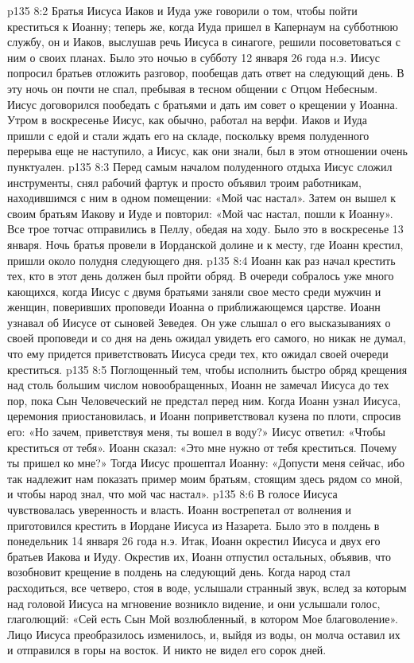 \vs p135 8:2 Братья Иисуса Иаков и Иуда уже говорили о том, чтобы пойти креститься к Иоанну; теперь же, когда Иуда пришел в Капернаум на субботнюю службу, он и Иаков, выслушав речь Иисуса в синагоге, решили посоветоваться с ним о своих планах. Было это ночью в субботу 12 января 26 года н.э. Иисус попросил братьев отложить разговор, пообещав дать ответ на следующий день. В эту ночь он почти не спал, пребывая в тесном общении с Отцом Небесным. Иисус договорился пообедать с братьями и дать им совет о крещении у Иоанна. Утром в воскресенье Иисус, как обычно, работал на верфи. Иаков и Иуда пришли с едой и стали ждать его на складе, поскольку время полуденного перерыва еще не наступило, а Иисус, как они знали, был в этом отношении очень пунктуален.
\vs p135 8:3 Перед самым началом полуденного отдыха Иисус сложил инструменты, снял рабочий фартук и просто объявил троим работникам, находившимся с ним в одном помещении: «Мой час настал». Затем он вышел к своим братьям Иакову и Иуде и повторил: «Мой час настал, пошли к Иоанну». Все трое тотчас отправились в Пеллу, обедая на ходу. Было это в воскресенье 13 января. Ночь братья провели в Иорданской долине и к месту, где Иоанн крестил, пришли около полудня следующего дня.
\vs p135 8:4 \pc Иоанн как раз начал крестить тех, кто в этот день должен был пройти обряд. В очереди собралось уже много кающихся, когда Иисус с двумя братьями заняли свое место среди мужчин и женщин, поверивших проповеди Иоанна о приближающемся царстве. Иоанн узнавал об Иисусе от сыновей Зеведея. Он уже слышал о его высказываниях о своей проповеди и со дня на день ожидал увидеть его самого, но никак не думал, что ему придется приветствовать Иисуса среди тех, кто ожидал своей очереди креститься.
\vs p135 8:5 Поглощенный тем, чтобы исполнить быстро обряд крещения над столь большим числом новообращенных, Иоанн не замечал Иисуса до тех пор, пока Сын Человеческий не предстал перед ним. Когда Иоанн узнал Иисуса, церемония приостановилась, и Иоанн поприветствовал кузена по плоти, спросив его: «Но зачем, приветствуя меня, ты вошел в воду?» Иисус ответил: «Чтобы креститься от тебя». Иоанн сказал: «Это мне нужно от тебя креститься. Почему ты пришел ко мне?» Тогда Иисус прошептал Иоанну: «Допусти меня сейчас, ибо так надлежит нам показать пример моим братьям, стоящим здесь рядом со мной, и чтобы народ знал, что мой час настал».
\vs p135 8:6 \pc В голосе Иисуса чувствовалась уверенность и власть. Иоанн вострепетал от волнения и приготовился крестить в Иордане Иисуса из Назарета. Было это в полдень в понедельник 14 января 26 года н.э. Итак, Иоанн окрестил Иисуса и двух его братьев Иакова и Иуду. Окрестив их, Иоанн отпустил остальных, объявив, что возобновит крещение в полдень на следующий день. Когда народ стал расходиться, все четверо, стоя в воде, услышали странный звук, вслед за которым над головой Иисуса на мгновение возникло видение, и они услышали голос, глаголющий: «Сей есть Сын Мой возлюбленный, в котором Мое благоволение». Лицо Иисуса преобразилось изменилось, и, выйдя из воды, он молча оставил их и отправился в горы на восток. И никто не видел его сорок дней.
